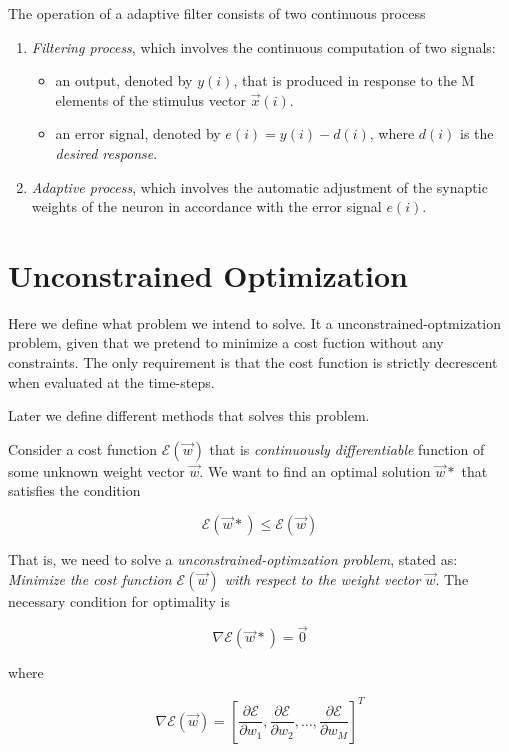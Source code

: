 \documentclass[twocolumn]{article}
\begin{document}
The operation of a adaptive filter consists of two continuous process

\begin{enumerate}
	\item \textit{Filtering process}, which involves the continuous computation of two signals:
		\begin{itemize}
			\item an output, denoted by $ y (i) $, that is produced in response to the M elements of the stimulus vector $ \vec{x} (i) $.
			\item an error signal, denoted by $ e (i) = y (i) - d (i)$, where $ d (i) $ is the \textit{desired response}.
		\end{itemize}
	\item \textit{Adaptive process}, which involves the automatic adjustment of the synaptic weights of the neuron in accordance with the error signal $ e (i) $.
\end{enumerate}

\section{Unconstrained Optimization}

Here we define what problem we intend to solve. It a unconstrained-optmization problem, given that we pretend to minimize a cost fuction without any constraints. The only requirement is that the cost function is strictly decrescent when evaluated at the time-steps.

Later we define different methods that solves this problem.

Consider a cost function $ \mathcal{E} ( \vec{w}) $ that is \textit{continuously differentiable} function of some unknown weight vector $ \vec{w} $. We want to find an optimal solution $ \vec{w}* $ that satisfies the condition

$$ \mathcal{E} ( \vec{w}*) \leq \mathcal{E} ( \vec{w}) $$

That is, we need to solve a \textit{unconstrained-optimzation problem}, stated as: \textit{Minimize the cost function $ \mathcal{E} ( \vec{w}) $ with respect to the weight vector $ \vec{w} $}. The necessary condition for optimality is

$$ \nabla \mathcal{E} ( \vec{w}*) = \vec{0}$$

\noindent where 

$$ \nabla \mathcal{E} ( \vec{w}) = \left[ \dfrac{\partial \mathcal{E}}{\partial w_{1}}, \dfrac{\partial \mathcal{E}}{\partial w_{2}},\ldots, \dfrac{\partial \mathcal{E}}{\partial w_{M}} \right]^{T} $$
\end{document}

